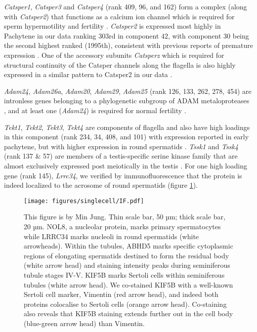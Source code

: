 \textit{Catsper1}, \textit{Catsper3} and \textit{Catsper4} (rank 409, 96, and 162) form a complex (along with \textit{Catsper2}) that functions as a calcium ion channel which is required for sperm hypermotility and fertility \parencite{Ren2001sperm, Lobley2003Identification, Qi2007All, Jin2007Catsper3}. \textit{Catsper2} is expressed most highly in Pachytene in our data ranking 303rd in component 42, with component 30 being the second highest ranked (1995th), consistent with previous reports of premature expression \parencite{Schultz2003multitude}. One of the accessory subunits \textit{Catsperz} which is required for structural continuity of the Catsper channels along the flagella is also highly expressed in a similar pattern to Catsper2 in our data \parencite{Chung2017CatSperz}.

\textit{Adam24}, \textit{Adam26a}, \textit{Adam20}, \textit{Adam29}, \textit{Adam25} (rank 126, 133, 262, 278, 454) are intronless genes belonging to a phylogenetic subgroup of ADAM metaloproteases \parencite{Choi2004Characterization}, and at least one (\textit{Adam24}) is required for normal fertility \parencite{Zhu2009Testase}.

\textit{Tekt1}, \textit{Tekt2}, \textit{Tekt3}, \textit{Tekt4} are components of flagella \parencite{Amos2008tektin} and also have high loadings in this component (rank 234, 34, 408, and 101) with expression reported in early pachytene, but with higher expression in round spermatids \parencite{Fallahi2010Global}. \textit{Tssk1} and \textit{Tssk4} (rank 137 \& 57) are members of a testis-specific serine kinase family that are almost exclusively expressed post meiotically in the testis \parencite{Li2011Expression}. For one high loading gene (rank 145), \textit{Lrrc34}, we verified by immunofluorescence that the protein is indeed localized to the acrosome of round spermatids (figure \ref{fig:IF}). 

\begin{figure}[H]
	\centering
	\texttt{[image: figures/singlecell/IF.pdf]}
	\caption[Novel Immunofluorescence Markers]{
		This figure is by Min Jung. Thin scale bar, 50 µm; thick scale bar, 20 µm.
		NOL8, a nucleolar protein, marks primary spermatocytes while LRRC34 marks nucleoli in round spermatids (white arrowheads).
		Within the tubules, ABHD5 marks specific cytoplasmic regions of elongating spermatids destined to form the residual body (white arrow head) and staining intensity peaks during seminiferous tubule stages IV-V.
		KIF5B marks Sertoli cells within seminiferous tubules (white arrow head). We co-stained KIF5B with a well-known Sertoli cell marker, Vimentin (red arrow head), and indeed both proteins colocalise to Sertoli cells (orange arrow head). Co-staining also reveals that KIF5B staining extends further out in the cell body (blue-green arrow head) than Vimentin.
	}
	\label{fig:IF}
\end{figure}

